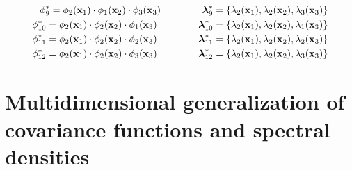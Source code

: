 \documentclass[]{interact}
\theoremstyle{plain}%
\theoremstyle{definition}
\theoremstyle{remark}
\begin{document}
\begin{eqnarray}
%
\phi^{\ast}_9= \phi_{2}(\mathbf{x}_1) \cdot \phi_{1}(\mathbf{x}_2) \cdot \phi_{3}(\mathbf{x}_3) \hspace{1.5cm} \boldsymbol{\lambda}^{\ast}_9= \{\lambda_2(\mathbf{x}_1), \lambda_2(\mathbf{x}_2), \lambda_3(\mathbf{x}_3)\} \nonumber \\
%
\phi^{\ast}_{10}= \phi_{2}(\mathbf{x}_1) \cdot \phi_{2}(\mathbf{x}_2) \cdot \phi_{1}(\mathbf{x}_3) \hspace{1.5cm} \boldsymbol{\lambda}^{\ast}_{10}= \{\lambda_2(\mathbf{x}_1), \lambda_2(\mathbf{x}_2), \lambda_1(\mathbf{x}_3)\} \nonumber \\
%
\phi^{\ast}_{11}= \phi_{2}(\mathbf{x}_1) \cdot \phi_{2}(\mathbf{x}_2) \cdot \phi_{2}(\mathbf{x}_3) \hspace{1.5cm} \boldsymbol{\lambda}^{\ast}_{11}= \{\lambda_2(\mathbf{x}_1), \lambda_2(\mathbf{x}_2), \lambda_2(\mathbf{x}_3)\} \nonumber \\
%
\phi^{\ast}_{12}= \phi_{2}(\mathbf{x}_1) \cdot \phi_{2}(\mathbf{x}_2) \cdot \phi_{3}(\mathbf{x}_3) \hspace{1.5cm} \boldsymbol{\lambda}^{\ast}_{12}= \{\lambda_2(\mathbf{x}_1), \lambda_2(\mathbf{x}_2), \lambda_3(\mathbf{x}_3)\} \nonumber
\end{eqnarray}

\section{Multidimensional generalization of covariance functions and spectral densities}
\end{document}
